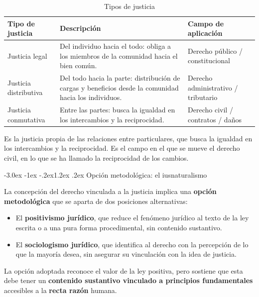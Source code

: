 \documentclass[12pt,oneside]{book}
\makeatletter
\renewcommand\section{\@startsection{section}{1}{\z@}%
  {-3.0ex \@plus -1ex \@minus -.2ex}{1.2ex \@plus .2ex}%
  {\normalfont\large\bfseries\color{acento}}}
\makeatother
\begin{document}
\begin{table}[H]
\centering
\begin{tabularx}{\textwidth}{B{0.22\textwidth} Y B{0.24\textwidth}}
\toprule
\textbf{Tipo de justicia} & \textbf{Descripción} & \textbf{Campo de aplicación} \\
\midrule
Justicia legal & Del individuo hacia el todo: obliga a los miembros de la comunidad hacia el bien común. & Derecho público / constitucional \\
Justicia distributiva & Del todo hacia la parte: distribución de cargas y beneficios desde la comunidad hacia los individuos. & Derecho administrativo / tributario \\
Justicia conmutativa & Entre las partes: busca la igualdad en los intercambios y la reciprocidad. & Derecho civil / contratos / daños \\
\bottomrule
\end{tabularx}
\caption{Tipos de justicia}
\end{table}

\begin{definicion}
Es la justicia propia de las relaciones entre particulares, que busca la igualdad en los intercambios y la reciprocidad. Es el campo en el que se mueve el derecho civil, en lo que se ha llamado la reciprocidad de los cambios.
\end{definicion}

\section{Opción metodológica: el iusnaturalismo}

La concepción del derecho vinculada a la justicia implica una \textbf{opción metodológica} que se aparta de dos posiciones alternativas:

\begin{itemize}
\item El \textbf{positivismo jurídico}, que reduce el fenómeno jurídico al texto de la ley escrita o a una pura forma procedimental, sin contenido sustantivo.
\item El \textbf{sociologismo jurídico}, que identifica al derecho con la percepción de lo que la mayoría desea, sin asegurar su vinculación con la idea de justicia.
\end{itemize}

La opción adoptada reconoce el valor de la ley positiva, pero sostiene que esta debe tener un \textbf{contenido sustantivo vinculado a principios fundamentales} accesibles a la \textbf{recta razón} humana.
\end{document}

